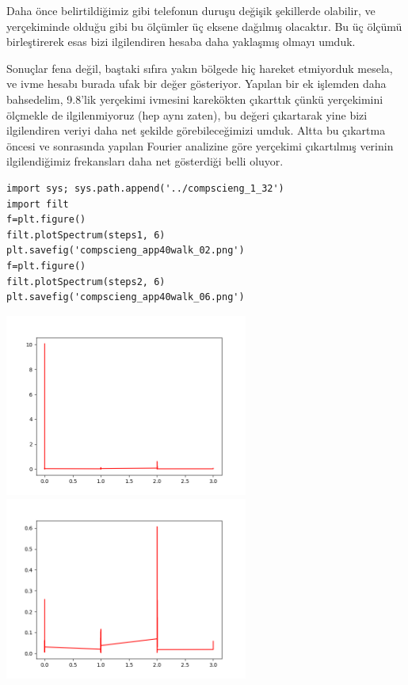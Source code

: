 \documentclass[12pt,fleqn]{article}\usepackage{../../common}
\begin{document}
Daha önce belirtildiğimiz gibi telefonun duruşu değişik şekillerde
olabilir, ve yerçekiminde olduğu gibi bu ölçümler üç eksene dağılmış
olacaktır. Bu üç ölçümü birleştirerek esas bizi ilgilendiren hesaba daha
yaklaşmış olmayı umduk. 

Sonuçlar fena değil, baştaki sıfıra yakın bölgede hiç hareket etmiyorduk
mesela, ve ivme hesabı burada ufak bir değer gösteriyor. Yapılan bir ek
işlemden daha bahsedelim, 9.8'lik yerçekimi ivmesini karekökten çıkarttık
çünkü yerçekimini ölçmekle de ilgilenmiyoruz (hep aynı zaten), bu değeri
çıkartarak yine bizi ilgilendiren veriyi daha net şekilde görebileceğimizi
umduk. Altta bu çıkartma öncesi ve sonrasında yapılan Fourier analizine
göre yerçekimi çıkartılmış verinin ilgilendiğimiz frekansları daha net
gösterdiği belli oluyor.

\begin{verbatim}
import sys; sys.path.append('../compscieng_1_32')
import filt
f=plt.figure()
filt.plotSpectrum(steps1, 6)
plt.savefig('compscieng_app40walk_02.png')
f=plt.figure()
filt.plotSpectrum(steps2, 6)
plt.savefig('compscieng_app40walk_06.png')
\end{verbatim}

\includegraphics[height=6cm]{compscieng_app40walk_02.png}
\includegraphics[height=6cm]{compscieng_app40walk_06.png}
\end{document}
